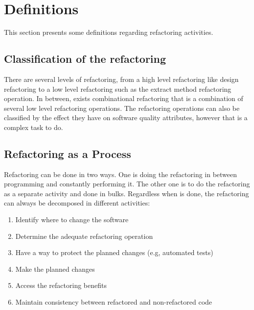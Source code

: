 \section{Definitions}



This section presents some definitions regarding refactoring activities.

\subsection{Classification of the refactoring}
There are several levels of refactoring, from a high level refactoring like design refactoring to a low level refactoring such as the extract method refactoring operation. 
In between, exists combinational refactoring that is a combination of several low level refactoring operations.
The refactoring operations can also be classified by the effect they have on software quality attributes, however that is a complex task to do. \cite{elish2011classification}

\subsection{Refactoring as a Process}
Refactoring can be done in two ways. %
One is doing the refactoring in between programming and constantly performing it. 
The other one is to do the refactoring as a separate activity and done in bulks.
Regardless when is done, the refactoring can always be decomposed in different activities: \cite{erb2010survey}

\begin{enumerate}
 \item Identify where to change the software
 \item Determine the adequate refactoring operation
 \item Have a way to protect the planned changes (e.g, automated tests)
 \item Make the planned changes
 \item Access the refactoring benefits
 \item Maintain consistency between refactored and non-refactored code 
\end{enumerate}




